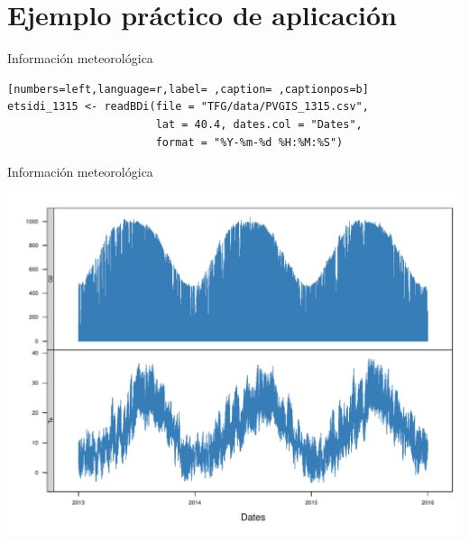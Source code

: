 \documentclass[aspectratio=169, usenames,svgnames,dvipsnames]{beamer}
\begin{document}
\section{Ejemplo práctico de aplicación}
\label{sec:orge5a158d}
\begin{frame}[label={sec:orgd6219d5},fragile]{Información meteorológica}
 \begin{lstlisting}[numbers=left,language=r,label= ,caption= ,captionpos=b]
etsidi_1315 <- readBDi(file = "TFG/data/PVGIS_1315.csv",
                       lat = 40.4, dates.col = "Dates",
                       format = "%Y-%m-%d %H:%M:%S")
\end{lstlisting}
\end{frame}

\begin{frame}[label={sec:org822935c}]{Información meteorológica}
\begin{center}
\includegraphics[height=0.9\textheight]{../figuras/ejemplos3.pdf}
\end{center}
\end{frame}
\end{document}
